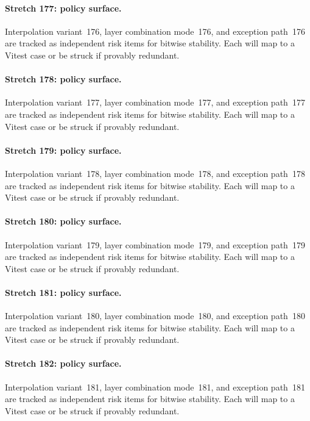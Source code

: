 \documentclass[sigconf,nonacm]{acmart}
\begin{document}
\paragraph{Stretch 177: policy surface.}
Interpolation variant~176, layer combination mode~176, and exception path~176 are tracked as independent risk items for bitwise stability. Each will map to a Vitest case or be struck if provably redundant. %

\paragraph{Stretch 178: policy surface.}
Interpolation variant~177, layer combination mode~177, and exception path~177 are tracked as independent risk items for bitwise stability. Each will map to a Vitest case or be struck if provably redundant. %

\paragraph{Stretch 179: policy surface.}
Interpolation variant~178, layer combination mode~178, and exception path~178 are tracked as independent risk items for bitwise stability. Each will map to a Vitest case or be struck if provably redundant. %

\paragraph{Stretch 180: policy surface.}
Interpolation variant~179, layer combination mode~179, and exception path~179 are tracked as independent risk items for bitwise stability. Each will map to a Vitest case or be struck if provably redundant. %

\paragraph{Stretch 181: policy surface.}
Interpolation variant~180, layer combination mode~180, and exception path~180 are tracked as independent risk items for bitwise stability. Each will map to a Vitest case or be struck if provably redundant. %

\paragraph{Stretch 182: policy surface.}
Interpolation variant~181, layer combination mode~181, and exception path~181 are tracked as independent risk items for bitwise stability. Each will map to a Vitest case or be struck if provably redundant. %
\end{document}
